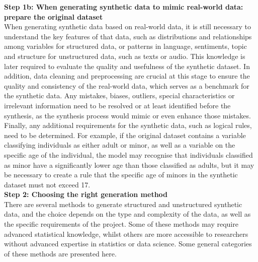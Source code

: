 \textbf{Step 1b: When generating synthetic data to mimic real-world data: prepare the original dataset} \\
When generating synthetic data based on real-world data, it is still necessary to understand the key features of that data, such as distributions and relationships among variables for structured data, or patterns in language, sentiments, topic and structure for unstructured data, such as texts or audio. This knowledge is later required to evaluate the quality and usefulness of the synthetic dataset. In addition, data cleaning and preprocessing are crucial at this stage to ensure the quality and consistency of the real-world data, which serves as a benchmark for the synthetic data. Any mistakes, biases, outliers, special characteristics or irrelevant information need to be resolved or at least identified before the synthesis, as the synthesis process would mimic or even enhance those mistakes. Finally, any additional requirements for the synthetic data, such as logical rules, need to be determined. For example, if the original dataset contains a variable classifying individuals as either adult or minor, as well as a variable on the specific age of the individual, the model may recognise that individuals classified as minor have a significantly lower age than those classified as adults, but it may be necessary to create a rule that the specific age of minors in the synthetic dataset must not exceed 17. \\

\textbf{Step 2: Choosing the right generation method} \\
There are several methods to generate structured and unstructured synthetic data, and the choice depends on the type and complexity of the data, as well as the specific requirements of the project. Some of these methods may require advanced statistical knowledge, whilst others are more accessible to researchers without advanced expertise in statistics or data science. Some general categories of these methods are presented here.
 
